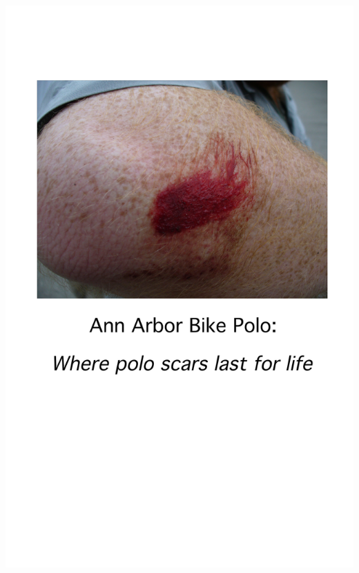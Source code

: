 \documentclass[12pt]{article}
\begin{document}
\newpage

\includegraphics{back.png}

\newpage
\end{document}
